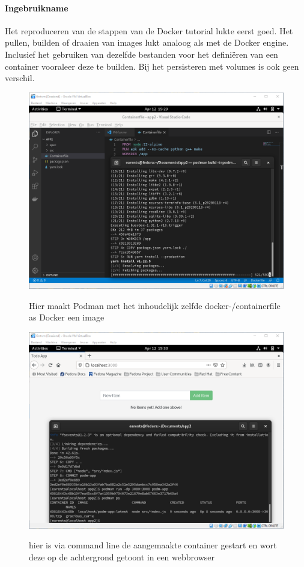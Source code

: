 \paragraph{Ingebruikname}
Het reproduceren van de stappen van de Docker tutorial lukte eerst goed.  Het pullen, builden of draaien van images lukt analoog als met de Docker engine. Inclusief het gebruiken van dezelfde bestanden voor het definiëren van een container vooraleer deze te builden.  Bij het persisteren met volumes is ook geen verschil.
\begin{figure}[h]
    \includegraphics[width=\linewidth]{img/podmanbuild.png}
    \label{fig:podmanbuild}
    \caption[Een dockerfile in VS code om met podman te builden]{Hier maakt Podman met het inhoudelijk zelfde docker-/containerfile as Docker een image}
    \centering
\end{figure}
\begin{figure}[h]
    \includegraphics[width=\linewidth]{img/podmanrun.png}
    \label{fig:podmanrun}
    \caption[Podman die een web ap uitvoert]{hier is via command line de aangemaakte container gestart en wort deze op de achtergrond getoont in een webbrowser}
    \centering
\end{figure}

